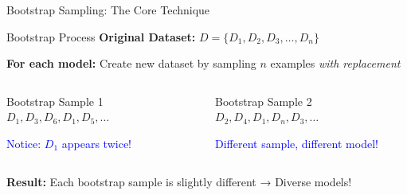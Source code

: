 \documentclass[8pt]{beamer}
\begin{document}
\begin{frame}{Bootstrap Sampling: The Core Technique}
\begin{examplebox}{Bootstrap Process}
\textbf{Original Dataset:} $D = \{D_1, D_2, D_3, \ldots, D_n\}$

\textbf{For each model:} Create new dataset by sampling $n$ examples \emph{with replacement}
\end{examplebox}

\begin{columns}
\begin{column}{0.5\textwidth}
\begin{definitionbox}{Bootstrap Sample 1}
$D_1, D_3, D_6, D_1, D_5, \ldots$

\textcolor{blue}{Notice: $D_1$ appears twice!}
\end{definitionbox}
\end{column}

\begin{column}{0.5\textwidth}
\begin{definitionbox}{Bootstrap Sample 2}
$D_2, D_4, D_1, D_n, D_3, \ldots$

\textcolor{blue}{Different sample, different model!}
\end{definitionbox}
\end{column}
\end{columns}

\begin{keypointsbox}
\textbf{Result:} Each bootstrap sample is slightly different → Diverse models!
\end{keypointsbox}
\end{frame}
\end{document}
